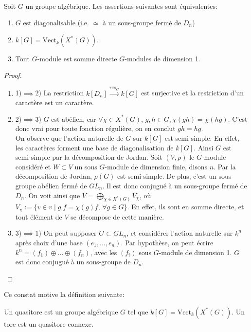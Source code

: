 \begin{prop}
Soit $G$ un groupe algébrique. Les assertions suivantes sont équivalentes:
\begin{enumerate}
\item $G$ est diagonalisable (i.e. $\simeq$ à un sous-groupe fermé de $D_n$)
\item $k[G]=\textrm{Vect}_k(X^*(G))$.
\item Tout $G$-module est somme directe $G$-modules de dimension 1.
\end{enumerate}
\end{prop}
\begin{proof}
\begin{enumerate}
\item 1)$\implies$2) La restriction $k[D_n]\xrightarrow{res_G} k[G]$ est surjective et la restriction d'un caractère est un caractère.
\item 2)$\implies$3) $G$ est abélien, car $\forall \chi\in X^*(G),\,g,h\in G, \chi(gh)=\chi(hg)$. C'est donc vrai pour toute fonction régulière, on en conclut $gh=hg$.\\
On observe que l'action naturelle de $G$ sur $k[G]$ est semi-simple. En effet, les caractères forment une base de diagonalisation de $k[G]$. Ainsi $G$ est semi-simple par la décomposition de Jordan. Soit $(V,\rho)$ le $G$-module considéré et $W\subset V$ un sous $G$-module de dimension finie, disons $n$. Par la décomposition de Jordan,  $\rho(G)$ est semi-simple. De plus, c'est un sous groupe abélien fermé de $GL_n$. Il est donc conjugué à un sous-groupe fermé de $D_n$. On voit ainsi que $V=\bigoplus_{\chi \in X^*(G)}V_\chi$, où $V_\chi:=\lbrace v\in v\mid g.f=\chi(g)f,\, \forall g\in G \rbrace$. En effet, ils sont en somme directe, et tout élément de $V$ se décompose de cette manière.
\item 3)$\implies$1) On peut supposer $G\subset GL_n$, et considérer l'action naturelle sur $k^n$ après choix d'une base $(e_1,...,e_n)$. Par hypothèse, on peut écrire $k^n=(f_1)\oplus...\oplus (f_n)$, avec les $(f_i)$ sous $G$-module de dimension 1. $G$ est donc conjugué à un sous-groupe de $D_n$.
\end{enumerate}
\end{proof}

Ce constat motive la définition suivante:

\begin{defn}
Un quasitore est un groupe algébrique $G$ tel que $k[G]=\textrm{Vect}_k(X^*(G))$. Un tore est un quasitore connexe.
\end{defn}

